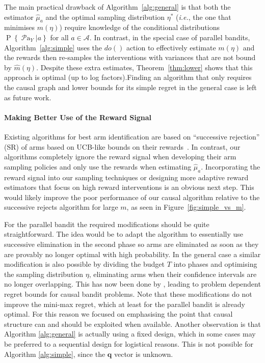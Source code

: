 \documentclass[11pt,a4paper,twoside]{report}
\newcommand{\Pn}[2]{\operatorname{P}\left\{#2|#1\right\}}
\newcommand{\calA}{\mathcal A}
\newcommand{\ie}{\textit{i.e.}}
\newcommand{\parents}[1]{\operatorname{\mathcal{P}a}_{#1}}
\renewcommand{\vec}[1]{\boldsymbol{#1}}
\theoremstyle{plain}
\theoremstyle{definition}
\begin{document}
The main practical drawback of Algorithm~\ref{alg:general} is that both the estimator $\hat{\mu}_a$ and the optimal sampling distribution $\eta^*$ (\ie, the one that minimises $m(\eta)$) require knowledge of the conditional distributions $\Pn{a}{\parents{Y}}$ for all $a \in \calA$. In contrast, in the special case of parallel bandits, Algorithm~\ref{alg:simple} uses the $do()$ action to effectively estimate $m(\eta)$ and the rewards then re-samples the interventions with variances that are not bound by $\hat{m}(\eta)$.
Despite these extra estimates, Theorem~\ref{thm:lower} shows that this approach is optimal (up to log factors).Finding an algorithm that only requires the causal graph and lower bounds for its simple regret in the general case is left as future work.


\paragraph{Making Better Use of the Reward Signal}
Existing algorithms for best arm identification are based on ``successive rejection'' (SR) of arms based on UCB-like bounds on their rewards~\citep{Even-Dar2002}. In contrast, our algorithms completely ignore the reward signal when developing their arm sampling policies and only use the rewards when estimating $\hat{\mu}_a$. Incorporating the reward signal into our sampling techniques or designing more adaptive reward estimators that focus on high reward interventions is an obvious next step. This would likely improve the poor performance of our causal algorithm relative to the successive rejects algorithm for large $m$, as seen in Figure~\ref{fig:simple_vs_m}.

For the parallel bandit the required modifications should be quite straightforward. The idea would be to adapt the algorithm to essentially use successive elimination in the second phase so arms are eliminated as soon as they are provably no longer optimal with high probability. In the general case a similar modification is also possible by dividing the budget $T$ into phases and optimising the sampling distribution $\eta$, eliminating arms when their confidence intervals are no longer overlapping. This has now been done by \citet{Sen2017a}, leading to problem dependent regret bounds for causal bandit problems. Note that these modifications do not improve the mini-max regret, which at least for the parallel bandit is already optimal. For this reason we focused on emphasising the point that causal structure can and should be exploited when available. Another observation is that Algorithm \ref{alg:general} is actually using a fixed design, which in some cases may be preferred to a sequential design for logistical reasons. This is not possible for Algorithm \ref{alg:simple}, since the $\vec{q}$ vector is unknown.
\end{document}
